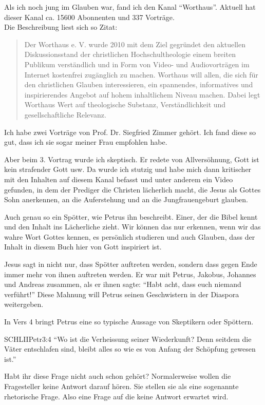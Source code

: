 \documentclass[fontsize=16pt]{mybib}
\begin{document}
\begin{otsblock}
Als ich noch jung im Glauben war, fand ich den Kanal \enquote{Worthaus}. Aktuell hat dieser Kanal ca. 15600 Abonnenten und 337 Vorträge.\\
Die Beschreibung liest sich so Zitat:
\begin{quote}
  Der Worthaus e. V. wurde 2010 mit dem Ziel gegründet den aktuellen Diskussionsstand der christlichen Hochschultheologie einem breiten Publikum verständlich und in Form von Video- und Audiovorträgen im Internet kostenfrei zugänglich zu machen. Worthaus will allen, die sich für den christlichen Glauben interessieren, ein spannendes, informatives und inspirierendes Angebot auf hohem inhaltlichem Niveau machen. Dabei legt Worthaus Wert auf theologische Substanz, Verständlichkeit und gesellschaftliche Relevanz.
\end{quote}
Ich habe zwei Vorträge von Prof. Dr. Siegfried Zimmer gehört. Ich fand diese so gut, dass ich sie sogar meiner Frau empfohlen habe.

Aber beim 3. Vortrag wurde ich skeptisch. Er redete von Allversöhnung, Gott ist kein strafender Gott usw. Da wurde ich stutzig und habe mich dann kritischer mit den Inhalten auf diesem Kanal befasst und unter anderem ein Video gefunden, in dem der Prediger die Christen lächerlich macht, die Jesus als Gottes Sohn anerkennen, an die Auferstehung und an die Jungfrauengeburt glauben.
\end{otsblock}

Auch genau so ein Spötter, wie Petrus ihn beschreibt. Einer, der die Bibel kennt und den Inhalt ins Lächerliche zieht. Wir können das nur erkennen, wenn wir das wahre Wort Gottes kennen, es persönlich studieren und auch Glauben, dass der Inhalt in diesem Buch hier von Gott inspiriert ist.

Jesus sagt in  nicht nur, dass Spötter auftreten werden, sondern dass gegen Ende immer mehr von ihnen auftreten werden. Er war mit Petrus, Jakobus, Johannes und Andreas zusammen, als er ihnen sagte: \enquote{Habt acht, dass euch niemand verführt!} Diese Mahnung will Petrus seinen Geschwistern in der Diaspora weitergeben.

In Vers 4 bringt Petrus eine so typische Aussage von Skeptikern oder Spöttern.
\begin{bibelbox}{SCHL}{IIPetr}{3:4}
\enquote{Wo ist die Verheissung seiner Wiederkunft? Denn seitdem die Väter entschlafen sind, bleibt alles so wie es von Anfang der Schöpfung gewesen ist.}
\end{bibelbox}
Habt ihr diese Frage nicht auch schon gehört? Normalerweise wollen die Fragesteller keine Antwort darauf hören. Sie stellen sie als eine sogenannte rhetorische Frage. Also eine Frage auf die keine Antwort erwartet wird.
\end{document}

